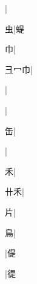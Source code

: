 \begin{multicols}{2}
{{}|{}\par
{\cjk{}{\cnsym{}　}{\cnsym{}　}虫}|{\cjk{}蝭}\par
{\cjk{}{\cnsym{}　}{\cnsym{}　}巾}|{}\par
{\cjk{}彐{\cnxHanaA{}冖}巾}|{}\par
{}|{}\par
{}|{}\par
{\cjk{}{\cnsym{}　}{\cnsym{}　}缶}|{}\par
{}|{}\par
{\cjk{}{\cnsym{}　}{\cnsym{}　}禾}|{}\par
{\cjk{}{\cnsym{}　}卄禾}|{}\par
{\cjk{}{\cnsym{}　}{\cnsym{}　}片}|{}\par
{\cjk{}{\cnsym{}　}{\cnsym{}　}鳥}|{}\par
{}|{\cjk{}偍}\par
{}|{\cjk{}徥}\par
}
\end{multicols}
